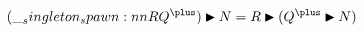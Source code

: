 \begin{equation*}
  \begin{lgathered}
    \nspawn{(\spawn{R}{Q^{\plus}})}{N}
      = \nspawn{R}{(\qpspawn{Q^{\plus}}{N})}
  \end{lgathered}
\end{equation*}





